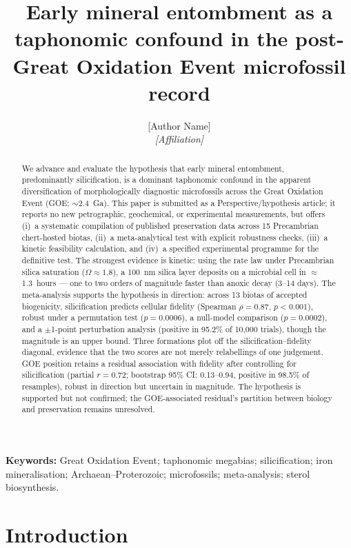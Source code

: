 \documentclass[11pt]{article}
\title{\vspace{-1.0cm}\textbf{Early mineral entombment as a taphonomic confound in the
post-Great Oxidation Event microfossil record}}
\author{[Author Name]\\
\small\textit{[Affiliation]}}
\date{}
\begin{document}
\maketitle

\begin{abstract}
\noindent We advance and evaluate the hypothesis that early mineral entombment, predominantly
silicification, is a dominant taphonomic confound in the apparent diversification of morphologically
diagnostic microfossils across the Great Oxidation Event (GOE; $\sim$2.4~Ga). This paper is submitted
as a Perspective/hypothesis article; it reports no new petrographic, geochemical, or experimental
measurements, but offers (i)~a systematic compilation of published preservation data across 15
Precambrian chert-hosted biotas, (ii)~a meta-analytical test with explicit robustness checks,
(iii)~a kinetic feasibility calculation, and (iv)~a specified experimental programme for the
definitive test. The strongest evidence is kinetic: using the \citet{Rimstidt1980} rate law under
Precambrian silica saturation ($\Omega \approx 1.8$), a 100~nm silica layer deposits on a microbial
cell in $\approx$1.3~hours --- one to two orders of magnitude faster than anoxic decay (3--14 days).
The meta-analysis supports the hypothesis in direction: across 13 biotas of accepted biogenicity,
silicification predicts cellular fidelity (Spearman $\rho = 0.87$, $p < 0.001$), robust under a
permutation test ($p = 0.0006$), a null-model comparison ($p = 0.0002$), and a $\pm$1-point
perturbation analysis (positive in 95.2\% of 10{,}000 trials), though the magnitude is an upper
bound. Three formations plot off the silicification--fidelity diagonal, evidence that the two scores
are not merely relabellings of one judgement. GOE position retains a residual association with
fidelity after controlling for silicification (partial $r = 0.72$; bootstrap 95\% CI: 0.13--0.94,
positive in 98.5\% of resamples), robust in direction but uncertain in magnitude. The hypothesis is
supported but not confirmed; the GOE-associated residual's partition between biology and preservation
remains unresolved.
\end{abstract}

\noindent\textbf{Keywords:} Great Oxidation Event; taphonomic megabias; silicification; iron
mineralisation; Archaean--Proterozoic; microfossils; meta-analysis; sterol biosynthesis.

\section{Introduction}
\end{document}
